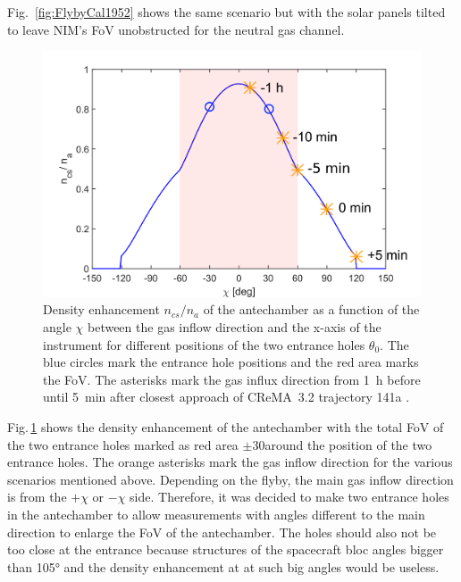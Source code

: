 Fig.~\ref{fig:FlybyCal1952} shows the same scenario but with the solar panels tilted to leave NIM's FoV unobstructed for the neutral gas channel. 
	\\
	\begin{figure}[h!]
		\centering
		\includegraphics[width=.8\textwidth]{Bilder/Chi_theta0_flyby.png}
		\caption{Density enhancement $n_{cs}/n_a$ of the antechamber as a function of the angle $\chi$ between the gas inflow direction and the x-axis of the instrument for different positions of the two entrance holes $\theta_0$. The blue circles mark the entrance hole positions and the red area marks the FoV. The asterisks mark the gas influx direction from 1~h before until 5~min after closest approach of CReMA~3.2 trajectory 141a \cite{SOC_Crema3p2}.}
		\label{fig:densEnhChiFlyby}
	\end{figure}
	Fig.\,\ref{fig:densEnhChiFlyby} shows the density enhancement of the antechamber with the total FoV of the two entrance holes marked as red area $\pm$30\degree around the position of the two entrance holes. The orange asterisks mark the gas inflow direction for the various scenarios mentioned above. Depending on the flyby, the main gas inflow direction is from the $+\chi$ or $-\chi$ side. Therefore, it was decided to make two entrance holes in the antechamber to allow measurements with angles different to the main direction to enlarge the FoV of the antechamber. The holes should also not be too close at the entrance because structures of the spacecraft bloc angles bigger than 105° and the density enhancement at at such big angles would be useless.\\
